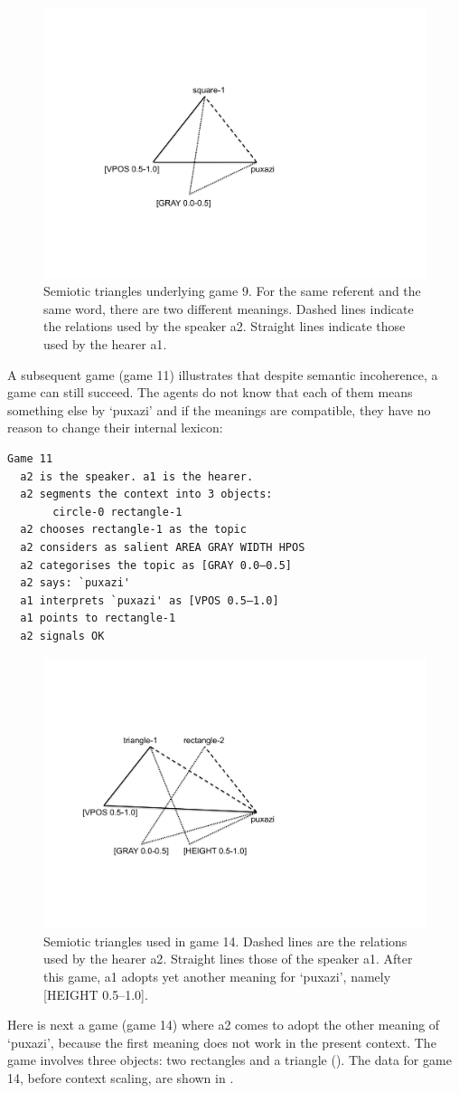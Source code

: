 \begin{figure}[htbp]
  \centerline{\includegraphics[width=.45\textwidth]{chap6/figs/triangle4.pdf}}
\caption{\label{triangle4}Semiotic triangles
underlying game 9. For the same referent and the same word, 
there are two different meanings. Dashed lines indicate
the relations used by the speaker {\bfshape  a2}. Straight lines
indicate those used by the hearer {\bfshape  a1}.}
\end{figure}

A subsequent game (game 11) illustrates that despite 
semantic incoherence, a game can still succeed. The agents 
do not know that each of them means something else by 
`puxazi' and if the meanings are compatible, they 
have no reason to change their internal lexicon:
\begin{verbatim}
Game 11
  a2 is the speaker. a1 is the hearer. 
  a2 segments the context into 3 objects: 
       circle-0 rectangle-1
  a2 chooses rectangle-1 as the topic 
  a2 considers as salient AREA GRAY WIDTH HPOS 
  a2 categorises the topic as [GRAY 0.0–0.5]
  a2 says: `puxazi'
  a1 interprets `puxazi' as [VPOS 0.5–1.0]
  a1 points to rectangle-1
  a2 signals OK 
\end{verbatim}



\begin{figure}[htbp]
  \centerline{\includegraphics[width=.60\textwidth]{chap6/figs/triangle3.pdf}}
\caption{\label{triangle3}Semiotic triangles used in
game 14. Dashed lines are the relations used by 
the hearer {\bfshape  a2}. Straight lines those of the 
speaker {\bfshape  a1}. After this game, {\bfshape  a1}
adopts yet another meaning for `puxazi', namely 
{}[HEIGHT 0.5–1.0].}
\end{figure}
Here is next a game (game 14) where {\bfshape  a2} comes to adopt 
the other meaning of `puxazi', because the first
meaning does not work in the present context. 
The game involves three objects: two rectangles and a 
triangle ().
The data for game 14, before context scaling, are
shown in . 


